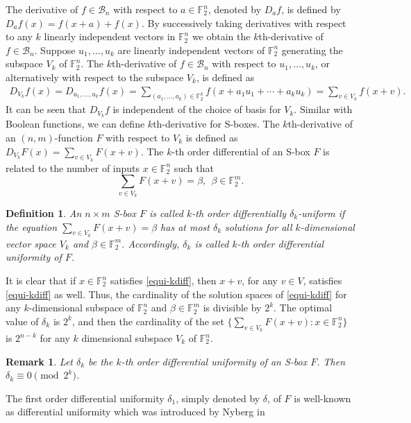 \documentclass[12 pt]{article}
\newtheorem{definition}{Definition}
\newtheorem{remark}{Remark}
\def\F{{\mathbb F}}
\begin{document}
The derivative of $f \in \mathcal B_n$ with respect to $a \in \F_2^n$, denoted by $D_af$, is defined by $D_af(x) = f(x + a) + f(x)$. By successively taking derivatives with respect to
any $k$ linearly independent vectors in $\F_2^n$ we obtain the $k$th-derivative of $f \in \mathcal B_n$. Suppose $u_1, \ldots, u_k$ are linearly independent vectors of $\F_2^n$ generating
the subspace $V_k$ of $\F_2^n$. The $k$th-derivative of $f \in \mathcal B_n$ with respect to $u_1, \ldots, u_k$, or alternatively with respect to the subspace $V_k$, is defined as
\begin{eqnarray*} \label{kderiv}
D_{V_k}f(x)=D_{u_1, \ldots, u_k}f(x) = \sum_{(a_1, \ldots, a_k)  \in \F_2^k}f(x+a_1u_1+\cdots + a_ku_k)=\sum_{v\in V_k}f(x+v).
\end{eqnarray*}
It can be seen that $D_{V_k}f$ is independent of the choice of basis for $V_k$. Similar with Boolean functions, we can define $k$th-derivative for S-boxes. The $k$th-derivative of  an $(n,m)$-function $F$ with respect to $V_k$ is defined as $D_{V_k}F(x)=\sum_{v\in V_k}F(x+v)$. The $k$-th order differential of an S-box $F$ \textup{\cite[Definition 4.2]{LRK95}}
is related to the number of inputs $x\in\mathbb F_2^n$  such that
\begin{equation}
\label{equi-kdiff}
\sum_{v\in V_k}F(x+v)=\beta,~~\beta\in \mathbb F_2^m.
\end{equation}
\begin{definition}\label{d1}
An $n\times m$ S-box $F$ is called $k$-th order differentially $\delta_k$-uniform if the equation $\sum_{v\in V_k}F(x+v) = \beta$ has at most $\delta_k$ solutions for all $k$-dimensional
vector space $V_k$ and $\beta \in \mathbb{F}_2^m$. Accordingly, $\delta_k$ is called $k$-th order differential uniformity of $F$.
\end{definition}
It is clear that if $x\in \mathbb F_2^n$ satisfies \eqref{equi-kdiff}, then $x+v$, for any $v\in V$, satisfies \eqref{equi-kdiff} as well. Thus, the cardinality of the solution spaces
of \eqref{equi-kdiff} for any $k$-dimensional subspace of $\F_2^n$ and $\beta\in\mathbb F_2^m$ is divisible by $2^k$. The optimal value of $\delta_k$ is $2^k$, and then the cardinality
of the set $\{\sum_{v\in V_k}F(x+v): x\in\mathbb F_2^n\}$ is $2^{n-k}$ for any $k$ dimensional subspace $V_k$ of $\mathbb F_2^n$.
\begin{remark}
Let $\delta_k$ be the $k$-th order differential uniformity of an S-box $F$. Then $\delta_k\equiv 0 \pmod{2^k}$.
\end{remark}
The first order differential uniformity $\delta_1$,  simply denoted by $\delta$, of $F$ is well-known as differential uniformity which was introduced by Nyberg in~\cite{Nyberg94}
\end{document}
